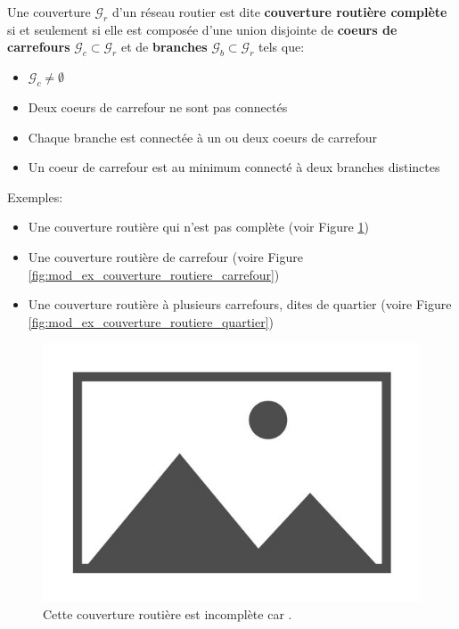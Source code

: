 \begin{definition}
    Une couverture $\mathcal{G}_r$ d'un réseau routier est dite \textbf{couverture routière complète} si et seulement si elle est composée d'une union disjointe de \textbf{coeurs de carrefours} $\mathcal{G}_c \subset \mathcal{G}_r$ et de \textbf{branches} $\mathcal{G}_b \subset \mathcal{G}_r$ tels que:

    \begin{itemize}
        \item $\mathcal{G}_c \neq \emptyset$ 
        \item Deux coeurs de carrefour ne sont pas connectés
        \item Chaque branche est connectée à un ou deux coeurs de carrefour
        \item Un coeur de carrefour est au minimum connecté à deux branches distinctes
    \end{itemize}

    Exemples:
    \begin{itemize}
        \item Une couverture routière qui n'est pas complète (voir Figure \ref{fig:mod_ex_couverture_routiere_incomplete})
        \item Une couverture routière de carrefour (voire Figure \ref{fig:mod_ex_couverture_routiere_carrefour})
        \item Une couverture routière à plusieurs carrefours, dites de quartier (voire Figure \ref{fig:mod_ex_couverture_routiere_quartier})
    \end{itemize}
\end{definition}

\begin{figure}
    \centering
    \includegraphics{images/placeholder.jpg}
    \caption{Cette couverture routière est incomplète car \todo{}.}
    \label{fig:mod_ex_couverture_routiere_incomplete}
\end{figure}

